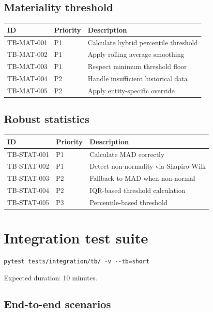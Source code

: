 \subsection{Materiality threshold}

\begin{tabularx}{\linewidth}{@{}l l X@{}}
\toprule
\textbf{ID} & \textbf{Priority} & \textbf{Description} \\ \midrule
TB-MAT-001 & P1 & Calculate hybrid percentile threshold \\
TB-MAT-002 & P1 & Apply rolling average smoothing \\
TB-MAT-003 & P1 & Respect minimum threshold floor \\
TB-MAT-004 & P2 & Handle insufficient historical data \\
TB-MAT-005 & P2 & Apply entity-specific override \\
\bottomrule
\end{tabularx}

\subsection{Robust statistics}

\begin{tabularx}{\linewidth}{@{}l l X@{}}
\toprule
\textbf{ID} & \textbf{Priority} & \textbf{Description} \\ \midrule
TB-STAT-001 & P1 & Calculate MAD correctly \\
TB-STAT-002 & P1 & Detect non-normality via Shapiro-Wilk \\
TB-STAT-003 & P2 & Fallback to MAD when non-normal \\
TB-STAT-004 & P2 & IQR-based threshold calculation \\
TB-STAT-005 & P3 & Percentile-based threshold \\
\bottomrule
\end{tabularx}

\section{Integration test suite}

\begin{lstlisting}[basicstyle=\ttfamily\small]
pytest tests/integration/tb/ -v --tb=short
\end{lstlisting}

Expected duration: 10 minutes.

\subsection{End-to-end scenarios}

